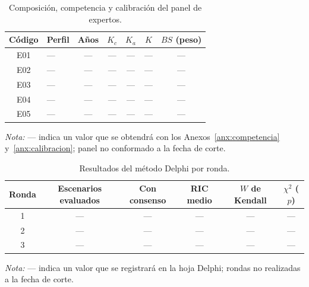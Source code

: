 \begin{table}[htbp]
  \centering
  \caption{Composición, competencia y calibración del panel de expertos.}
  \label{tab:panel_resultados}
  \footnotesize
  \renewcommand{\arraystretch}{1.2}
  \begin{tabular}{|c|l|c|c|c|c|c|}
    \hline
    \textbf{Código} & \textbf{Perfil} & \textbf{Años} & \textbf{$K_c$} & \textbf{$K_a$} & \textbf{$K$} & \textbf{$BS$ (peso)} \\
    \hline
    E01 & --- & --- & --- & --- & --- & --- \\ \hline
    E02 & --- & --- & --- & --- & --- & --- \\ \hline
    E03 & --- & --- & --- & --- & --- & --- \\ \hline
    E04 & --- & --- & --- & --- & --- & --- \\ \hline
    E05 & --- & --- & --- & --- & --- & --- \\ \hline
  \end{tabular}
  \par\vspace{2pt}
  \raggedright
  \textit{Nota:} --- indica un valor que se obtendrá con los Anexos~\ref{anx:competencia} y~\ref{anx:calibracion}; panel no conformado a la fecha de corte.
  \par\vspace{2pt}
\end{table}

\begin{table}[htbp]
  \centering
  \caption{Resultados del método Delphi por ronda.}
  \label{tab:delphi_rondas}
  \footnotesize
  \renewcommand{\arraystretch}{1.2}
  \begin{tabular}{|c|c|c|c|c|c|}
    \hline
    \textbf{Ronda} & \textbf{Escenarios evaluados} & \textbf{Con consenso} & \textbf{RIC medio} & \textbf{$W$ de Kendall} & \textbf{$\chi^2$ ($p$)} \\
    \hline
    1 & --- & --- & --- & --- & --- \\ \hline
    2 & --- & --- & --- & --- & --- \\ \hline
    3 & --- & --- & --- & --- & --- \\ \hline
  \end{tabular}
  \par\vspace{2pt}
  \raggedright
  \textit{Nota:} --- indica un valor que se registrará en la hoja Delphi; rondas no realizadas a la fecha de corte.
  \par\vspace{2pt}
\end{table}

